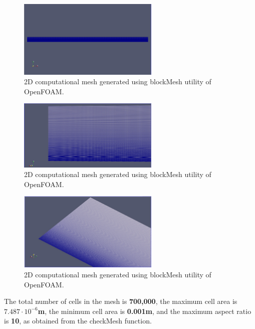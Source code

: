 \documentclass[a4paper]{article}
\begin{document}
\begin{figure}[H]
    \centering
    \includegraphics[width=0.6\textwidth]{mesh1.jpg}
    \caption{\small 2D computational mesh generated using blockMesh utility of OpenFOAM.}
    \label{fig:mesh1}
\end{figure} 
\vspace{0.3cm}
\begin{figure}[H]
    \centering
    \includegraphics[width=0.6\textwidth]{mesh2.jpg}
    \caption{\small 2D computational mesh generated using blockMesh utility of OpenFOAM.}
    \label{fig:mesh2}
\end{figure} 
\vspace{0.3cm}
\begin{figure}[H]
    \centering
    \includegraphics[width=0.6\textwidth]{mesh3.jpg}
    \caption{\small 2D computational mesh generated using blockMesh utility of OpenFOAM.}
    \label{fig:mesh3}
\end{figure} 
\vspace{0.3cm}

The total number of cells in the mesh is \textbf{700,000}, the maximum cell area is \textbf{$7.487 \cdot 10^{-6}$m}, the minimum cell area is \textbf{0.001m}, and the maximum aspect ratio is \textbf{10}, as obtained from the checkMesh function.
\end{document}
